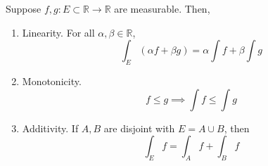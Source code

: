   \begin{theorem}
    Suppose $f, g : E \subset \mathbb{R} \to \mathbb{R}$ are measurable. Then, 
    \begin{enumerate}
      \item Linearity. For all $\alpha, \beta \in \mathbb{R}$, 
        \begin{equation}
          \int_E (\alpha f + \beta g) = \alpha \int f + \beta \int g
        \end{equation}

      \item Monotonicity. 
        \begin{equation}
          f \leq g \implies \int f \leq \int g
        \end{equation}

      \item Additivity. If $A, B$ are disjoint with $E = A \cup B$, then 
        \begin{equation}
          \int_E f = \int_A f + \int_B f
        \end{equation}
    \end{enumerate}
  \end{theorem} 
